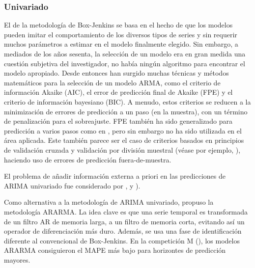 \documentclass{llncs}
\begin{document}
\begin{table}
\caption{Lista de ejemplos de aplicaciones reales}
\end{table}
\subsubsection{Univariado}

El  de la metodología de Box-Jenkins se basa en el hecho de que los modelos pueden imitar el comportamiento de los diversos tipos de series y sin requerir muchos parámetros a estimar en el modelo finalmente elegido. Sin embargo, a mediados de los años sesenta, la selección de un modelo era en gran medida una cuestión subjetiva del investigador, no había ningún algoritmo para encontrar el modelo apropiado. Desde entonces han surgido muchas técnicas y métodos matemáticos para la selección de un modelo ARMA, como el criterio de información Akaike (AIC), el error de predicción final de Akaike (FPE) y el criterio de información bayesiano (BIC). A menudo, estos criterios se reducen a la minimización de errores de predicción a un paso (en la muestra), con un término de penalización para el sobreajuste. FPE también ha sido generalizado para predicción a varios pasos como en \cite{Bhansali1999295}, pero sin embargo no ha sido utilizada en el área aplicada. Este también parece ser el caso de criterios basados en principios de validación cruzada y validación por división muestral (véase por ejemplo, \cite{West19961084}), haciendo uso de errores de predicción fuera-de-muestra.

El problema de añadir información externa a priori en las predicciones de ARIMA univariado fue considerado por  \cite{Cholette1982375}, \cite{Guerrero1991339} y \cite{deAlba199395}).

Como alternativa a la metodología de ARIMA univariado, \cite{Parzen198267} propuso la metodología ARARMA. La idea clave es que una serie temporal es transformada de un filtro AR de memoria larga, a un filtro de memoria corta, evitando así un operador de diferenciación más duro. Además, se usa una fase de identificación diferente al convencional de Box-Jenkins. En la competición M (\cite{Makridakis1982111}), los modelos ARARMA consiguieron el MAPE más bajo para horizontes de predicción mayores. 
\end{document}

